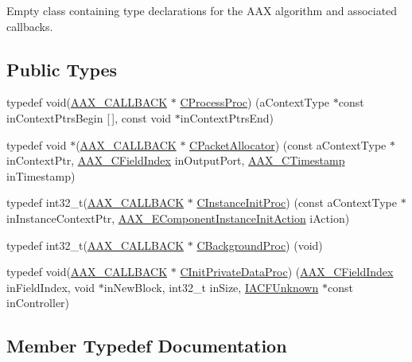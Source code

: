 Empty class containing type declarations for the A\+AX algorithm and associated callbacks. \subsection*{Public Types}
\begin{DoxyCompactItemize}
\item 
typedef void(\mbox{\hyperlink{a00392_aaa22112139aa627574b1ef562f579d43}{A\+A\+X\+\_\+\+C\+A\+L\+L\+B\+A\+CK}} $\ast$ \mbox{\hyperlink{a01437_a6376eebcd50474f744490ce6e4c53395}{C\+Process\+Proc}}) (a\+Context\+Type $\ast$const in\+Context\+Ptrs\+Begin \mbox{[}$\,$\mbox{]}, const void $\ast$in\+Context\+Ptrs\+End)
\item 
typedef void $\ast$(\mbox{\hyperlink{a00392_aaa22112139aa627574b1ef562f579d43}{A\+A\+X\+\_\+\+C\+A\+L\+L\+B\+A\+CK}} $\ast$ \mbox{\hyperlink{a01437_ab72700098d29650fcef553e827d8f1b4}{C\+Packet\+Allocator}}) (const a\+Context\+Type $\ast$in\+Context\+Ptr, \mbox{\hyperlink{a00392_ae807f8986143820cfb5d6da32165c9c7}{A\+A\+X\+\_\+\+C\+Field\+Index}} in\+Output\+Port, \mbox{\hyperlink{a00392_aae7325dbfa53a983f208a68cb563fba5}{A\+A\+X\+\_\+\+C\+Timestamp}} in\+Timestamp)
\item 
typedef int32\+\_\+t(\mbox{\hyperlink{a00392_aaa22112139aa627574b1ef562f579d43}{A\+A\+X\+\_\+\+C\+A\+L\+L\+B\+A\+CK}} $\ast$ \mbox{\hyperlink{a01437_adf90ef33bfecba08b4a723a85f9f2b59}{C\+Instance\+Init\+Proc}}) (const a\+Context\+Type $\ast$in\+Instance\+Context\+Ptr, \mbox{\hyperlink{a00491_aff5646376a3c93f032cf2400e0885023}{A\+A\+X\+\_\+\+E\+Component\+Instance\+Init\+Action}} i\+Action)
\item 
typedef int32\+\_\+t(\mbox{\hyperlink{a00392_aaa22112139aa627574b1ef562f579d43}{A\+A\+X\+\_\+\+C\+A\+L\+L\+B\+A\+CK}} $\ast$ \mbox{\hyperlink{a01437_a69fa55fbcbe19518395a0bf73bd12591}{C\+Background\+Proc}}) (void)
\item 
typedef void(\mbox{\hyperlink{a00392_aaa22112139aa627574b1ef562f579d43}{A\+A\+X\+\_\+\+C\+A\+L\+L\+B\+A\+CK}} $\ast$ \mbox{\hyperlink{a01437_a44affb8e2f47718b198bdf47f49ff2b1}{C\+Init\+Private\+Data\+Proc}}) (\mbox{\hyperlink{a00392_ae807f8986143820cfb5d6da32165c9c7}{A\+A\+X\+\_\+\+C\+Field\+Index}} in\+Field\+Index, void $\ast$in\+New\+Block, int32\+\_\+t in\+Size, \mbox{\hyperlink{a01409}{I\+A\+C\+F\+Unknown}} $\ast$const in\+Controller)
\end{DoxyCompactItemize}


\subsection{Member Typedef Documentation}
\mbox{\label{a01437_a6376eebcd50474f744490ce6e4c53395}} 
